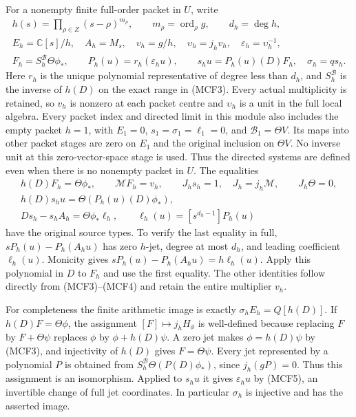 \documentclass[11pt,a4paper]{article}
\begin{document}
For a nonempty finite full-order packet in $U$, write
\[
\begin{gathered}
h(s)=\prod_{\rho\in Z}(s-\rho)^{m_\rho},\qquad
m_\rho=\operatorname{ord}_\rho g,\qquad d_h=\deg h,\\
E_h=\mathbb C[s]/h,\quad A_h=M_s,\quad v_h=g/h,\quad
\upsilon_h=j_hv_h,\quad\varepsilon_h=\upsilon_h^{-1},\\
F_h=S_h^{\mathscr B}\Theta\phi_*,\qquad
P_h(u)=r_h(\varepsilon_hu),\qquad
s_hu=P_h(u)(D)F_h,\quad \sigma_h=qs_h.
\end{gathered}
\tag{MCF4}
\]
Here $r_h$ is the unique polynomial representative of degree less than
$d_h$, and $S_h^{\mathscr B}$ is the inverse of $h(D)$ on the exact range
in (MCF3).  Every actual multiplicity is retained, so $v_h$ is nonzero
at each packet centre and $\upsilon_h$ is a unit in the full local algebra.
Every packet index and directed limit in this module also includes the
empty packet $h=1$, with $E_1=0$, $s_1=\sigma_1=\ell_1=0$, and
$\mathscr B_1=\Theta V$.  Its maps into other packet stages are zero
on $E_1$ and the original inclusion on $\Theta V$.  No inverse unit
at this zero-vector-space stage is used.  Thus the directed systems
are defined even when there is no nonempty packet in $U$.
The equalities
\[
\begin{gathered}
h(D)F_h=\Theta\phi_*,\qquad \mathcal MF_h=v_h,\qquad
J_hs_h=1,\quad J_h=j_h\mathcal M,\qquad J_h\Theta=0,\\
h(D)s_hu=\Theta(P_h(u)(D)\phi_*),\\
Ds_h-s_hA_h=\Theta\phi_*\ell_h,\qquad
\ell_h(u)=[s^{d_h-1}]P_h(u)
\end{gathered}
\tag{MCF5}
\]
have the original source types.  To verify the last equality in full,
$sP_h(u)-P_h(A_hu)$ has zero $h$-jet, degree at most $d_h$, and leading
coefficient $\ell_h(u)$.  Monicity gives
$sP_h(u)-P_h(A_hu)=h\ell_h(u)$.  Apply this polynomial in $D$ to $F_h$
and use the first equality.  The other identities follow directly from
(MCF3)--(MCF4) and retain the entire multiplier $v_h$.

For completeness the finite arithmetic image is exactly
$\sigma_hE_h=Q[h(D)]$.  If $h(D)F=\Theta\phi$, the assignment
$[F]\mapsto j_hH_\phi$ is well-defined because replacing $F$ by
$F+\Theta\psi$ replaces $\phi$ by $\phi+h(D)\psi$.  A zero jet makes
$\phi=h(D)\psi$ by (MCF3), and injectivity of $h(D)$ gives
$F=\Theta\psi$.  Every jet represented by a polynomial $P$ is obtained
from $S_h^{\mathscr B}\Theta(P(D)\phi_*)$, since $j_h(gP)=0$.
Thus this assignment is an isomorphism.  Applied to $s_hu$ it gives
$\varepsilon_hu$ by (MCF5), an invertible change of full jet coordinates.
In particular $\sigma_h$ is injective and has the asserted image.
\end{document}
